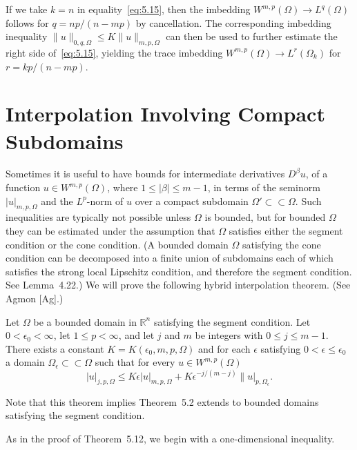 \begin{remark}
  If we take $k=n$ in equality~\eqref{eq:5.15}, then the imbedding $W^{m,p}(\Omega)\to L^q(\Omega)$
  follows for $q = np/(n-mp)$ by cancellation. The corresponding imbedding inequality
  $\|u\|_{0,q,\Omega} \leq K\|u\|_{m,p,\Omega}$ can then be used to further
  estimate the right side of~\eqref{eq:5.15}, yielding the trace imbedding
  $W^{m,p}(\Omega) \to L^r(\Omega_k)$ for $r = kp/(n-mp)$.
\end{remark}


\section{Interpolation Involving Compact Subdomains}

Sometimes it is useful to have bounds for intermediate derivatives $D^\beta u$,
of a function $u\in W^{m,p}(\Omega)$, where $1\leq |\beta|\leq m-1$,
in terms of the seminorm $|u|_{m,p,\Omega}$ and the $L^p$-norm of $u$
over a compact subdomain $\Omega'\subset\subset\Omega$. Such inequalities
are typically not possible unless $\Omega$ is bounded, but for bounded $\Omega$
they can be estimated under the assumption that $\Omega$ satisfies either the
segment condition or the cone condition. (A bounded domain $\Omega$
satisfying the cone condition can be decomposed into a finite union of
subdomains each of which satisfies the strong local Lipschitz condition,
and therefore the segment condition. See Lemma~4.22.) We will prove the
following hybrid interpolation theorem. (See Agmon [Ag].)

\begin{theorem}
  Let $\Omega$ be a bounded domain in $\mathbb{R}^n$ satisfying the segment
  condition. Let $0<\epsilon_0<\infty$, let $1\leq p<\infty$, and let $j$
  and $m$ be integers with $0\leq j\leq m-1$. There exists a constant
  $K = K(\epsilon_0,m,p,\Omega)$ and for each $\epsilon$ satisfying
  $0<\epsilon\leq\epsilon_0$ a domain $\Omega_\epsilon\subset\subset\Omega$
  such that for every $u\in W^{m,p}(\Omega)$
  \begin{equation}\label{eq:5.16}
    |u|_{j,p,\Omega} \leq K\epsilon |u|_{m,p,\Omega} + K\epsilon^{-j/(m-j)} \|u|_{p,\Omega_\epsilon}.
  \end{equation}
\end{theorem}

Note that this theorem implies Theorem~5.2 extends to bounded domains satisfying
the segment condition.

As in the proof of Theorem~5.12, we begin with a one-dimensional inequality.

